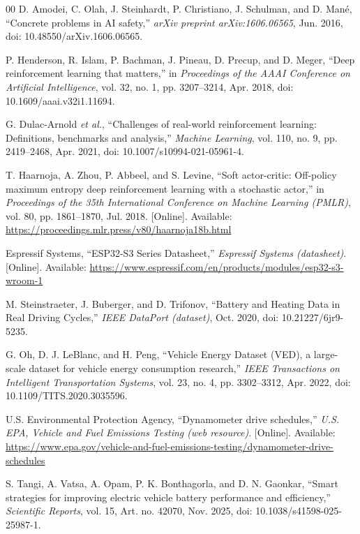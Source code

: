 \documentclass{ieeeaccess}
\begin{document}
\begin{thebibliography}{00}
 D. Amodei, C. Olah, J. Steinhardt, P. Christiano, J. Schulman, and D. Man\'{e}, ``Concrete problems in AI safety,'' \emph{arXiv preprint arXiv:1606.06565}, Jun. 2016, doi: 10.48550/arXiv.1606.06565.

 P. Henderson, R. Islam, P. Bachman, J. Pineau, D. Precup, and D. Meger, ``Deep reinforcement learning that matters,'' in \emph{Proceedings of the AAAI Conference on Artificial Intelligence}, vol. 32, no. 1, pp. 3207--3214, Apr. 2018, doi: 10.1609/aaai.v32i1.11694.

 G. Dulac-Arnold \emph{et al.}, ``Challenges of real-world reinforcement learning: Definitions, benchmarks and analysis,'' \emph{Machine Learning}, vol. 110, no. 9, pp. 2419--2468, Apr. 2021, doi: 10.1007/s10994-021-05961-4.

 T. Haarnoja, A. Zhou, P. Abbeel, and S. Levine, ``Soft actor-critic: Off-policy maximum entropy deep reinforcement learning with a stochastic actor,'' in \emph{Proceedings of the 35th International Conference on Machine Learning (PMLR)}, vol. 80, pp. 1861--1870, Jul. 2018. [Online]. Available: \url{https://proceedings.mlr.press/v80/haarnoja18b.html}

 Espressif Systems, ``ESP32-S3 Series Datasheet,'' \emph{Espressif Systems (datasheet)}. [Online]. Available: \url{https://www.espressif.com/en/products/modules/esp32-s3-wroom-1}

 M. Steinstraeter, J. Buberger, and D. Trifonov, ``Battery and Heating Data in Real Driving Cycles,'' \emph{IEEE DataPort (dataset)}, Oct. 2020, doi: 10.21227/6jr9-5235.

 G. Oh, D. J. LeBlanc, and H. Peng, ``Vehicle Energy Dataset (VED), a large-scale dataset for vehicle energy consumption research,'' \emph{IEEE Transactions on Intelligent Transportation Systems}, vol. 23, no. 4, pp. 3302--3312, Apr. 2022, doi: 10.1109/TITS.2020.3035596.

 U.S. Environmental Protection Agency, ``Dynamometer drive schedules,'' \emph{U.S. EPA, Vehicle and Fuel Emissions Testing (web resource)}. [Online]. Available: \url{https://www.epa.gov/vehicle-and-fuel-emissions-testing/dynamometer-drive-schedules}

 S. Tangi, A. Vatsa, A. Opam, P. K. Bonthagorla, and D. N. Gaonkar, ``Smart strategies for improving electric vehicle battery performance and efficiency,'' \emph{Scientific Reports}, vol. 15, Art. no. 42070, Nov. 2025, doi: 10.1038/s41598-025-25987-1.


\end{thebibliography}
\end{document}
